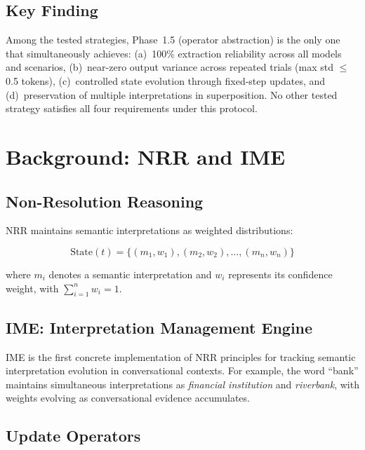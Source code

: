 \documentclass[11pt,a4paper]{article}
\begin{document}
\subsection{Key Finding}

Among the tested strategies, Phase~1.5 (operator abstraction) is the only one that simultaneously achieves:
(a)~100\% extraction reliability across all models and scenarios,
(b)~near-zero output variance across repeated trials (max std $\leq$ 0.5 tokens),
(c)~controlled state evolution through fixed-step updates, and
(d)~preservation of multiple interpretations in superposition.
No other tested strategy satisfies all four requirements under this protocol.

\section{Background: NRR and IME}
\label{sec:background}

\subsection{Non-Resolution Reasoning}

NRR maintains semantic interpretations as weighted distributions:

\begin{equation}
\text{State}(t) = \{(m_1, w_1), (m_2, w_2), \ldots, (m_n, w_n)\}
\end{equation}

where $m_i$ denotes a semantic interpretation and $w_i$ represents its confidence
weight, with $\sum_{i=1}^{n} w_i = 1$.

\subsection{IME: Interpretation Management Engine}

IME is the first concrete implementation of NRR principles for tracking semantic
interpretation evolution in conversational contexts. For example, the word ``bank''
maintains simultaneous interpretations as \textit{financial institution} and
\textit{riverbank}, with weights evolving as conversational evidence accumulates.

\subsection{Update Operators}
\end{document}
